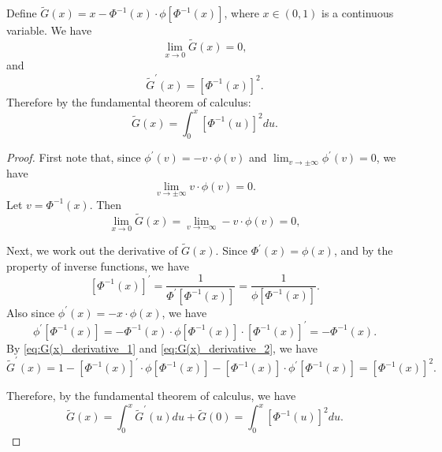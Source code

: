 \begin{lemma}
	\label{lemma:G(x)}
	Define $\tilde{G}(x)=  x-\Phi^{-1}(x)\cdot \phi \left[\Phi^{-1}(x)\right]$, where $x\in (0,1)$ is a continuous variable. We have
	\begin{equation*}
	\lim_{x\to 0} \tilde{G}(x) = 0,
	\end{equation*}
	and 
	\begin{equation*}
	\tilde{G}^\prime(x) = \left[\Phi^{-1}(x)\right]^2.
	\end{equation*}
	Therefore by the fundamental theorem of calculus:
	\begin{equation*}
	\tilde{G}(x) = \int_{0}^{x} \left[\Phi^{-1}(u)\right]^2 du.
	\end{equation*}
\end{lemma}
\begin{proof}
	First note that, since $\phi^\prime(v)= -v\cdot \phi(v)$ and $\lim_{v\to \pm \infty} \phi^\prime(v) =0$, we have
	\begin{equation*}
	\lim_{v\to \pm \infty} v \cdot \phi(v) = 0.
	\end{equation*}
	Let $v=\Phi^{-1}(x)$. Then
	\begin{equation*}
	\lim_{x\to 0} \tilde{G}(x)  = \lim_{v\to -\infty} -v \cdot \phi(v) = 0,
	\end{equation*}
	\iffalse
	and 
	\begin{equation}
	\lim_{x\to 1} \tilde{G}(x)  = 1- \lim_{v\to \infty} v \cdot \phi(v) = 1,
	\end{equation}
	\fi
	
	Next, we work out the derivative of $\tilde{G}(x)$. Since $\Phi^\prime(x) = \phi(x)$, and by the property of inverse functions, we have
	\begin{equation}
	\left[\Phi^{-1}(x)\right]^\prime = \frac{1}{\Phi^\prime \left[\Phi^{-1}(x)\right]}=\frac{1}{\phi \left[\Phi^{-1}(x)\right]}.
	\label{eq:G(x)_derivative_1}
	\end{equation}
	Also since $\phi^\prime(x) = -x\cdot \phi(x)$, we have
	\begin{equation}
	\phi^\prime\left[\Phi^{-1}(x)\right] = - \Phi^{-1}(x) \cdot \phi\left[\Phi^{-1}(x)\right] \cdot \left[\Phi^{-1}(x)\right]^\prime = -\Phi^{-1}(x).
	\label{eq:G(x)_derivative_2}
	\end{equation}
	By \eqref{eq:G(x)_derivative_1} and \eqref{eq:G(x)_derivative_2}, we have
	\begin{equation*}
	\tilde{G}^\prime(x) = 1 - \left[\Phi^{-1}(x)\right]^\prime \cdot  \phi\left[\Phi^{-1}(x)\right] - \left[\Phi^{-1}(x)\right] \cdot \phi^\prime\left[\Phi^{-1}(x)\right] =  \left[\Phi^{-1}(x)\right]^2.
	\end{equation*}
	
	Therefore, by the fundamental theorem of calculus, we have
	\begin{equation*}
	\tilde{G}(x) = \int_{0}^{x} \tilde{G}^\prime(u) du + \tilde{G}(0) = \int_{0}^{x} \left[\Phi^{-1}(u)\right]^2 du.
	\end{equation*}
\end{proof}

